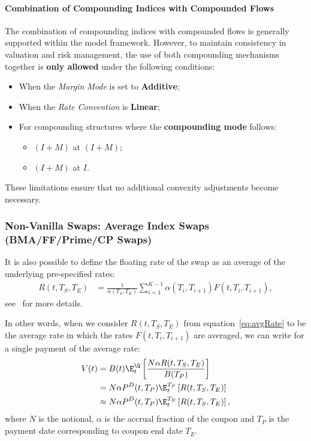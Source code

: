 \documentclass[]{pmv_report} %
\begin{document}
\paragraph{Combination of Compounding Indices with Compounded Flows}
The combination of compounding indices with compounded flows is generally supported within the model framework.
However, to maintain consistency in valuation and risk management, the use of both compounding mechanisms together is \textbf{only allowed} under the following conditions:
\begin{itemize}
    \item When the \textit{Margin Mode} is set to \textbf{Additive};
    \item When the \textit{Rate Convention} is \textbf{Linear};
    \item For compounding structures where the \textbf{compounding mode} follows:
    \begin{itemize}
        \item $(I+M)$ at $(I+M)$;
        \item $(I+M)$ at $I$.
    \end{itemize}
\end{itemize}
These limitations ensure that no additional convexity adjustments become necessary.

\subsubsection{Non-Vanilla Swaps: Average Index Swaps (BMA/FF/Prime/CP Swaps)} \label{sec:avgIdxSwap}
It is also possible to define the floating rate of the swap as an average of the underlying pre-specified rates:
\begin{align}
  R(t,T_S,T_E) &= \frac{1}{\alpha(T_S,T_E)} \sum_{i=1}^{K-1} \alpha(T_i,T_{i+1})F(t,T_i,T_{i+1}), \label{eq:avgRate}
\end{align}
see~\cite{Mx.StaticDataObjects} for more details.

In other words, when we consider $R(t,T_S,T_E)$ from equation~\eqref{eq:avgRate} to be the average rate in which the rates $F(t,T_i,T_{i+1})$ are averaged, we can write for a single payment of the average rate:
\begin{align}
  V(t) &= B(t) \E^{\Q}_t\left[ \frac{N \alpha R(t,T_S,T_E)}{B(T_P)}\right] \nonumber \\
  &= N \alpha P^D(t,T_P) \E^{T_P}_t\left[ R(t,T_S,T_E)\right]\nonumber \\
  &\approx N \alpha P^D(t,T_P) \E^{T_E}_t\left[ R(t,T_S,T_E)\right], \label{eq:avgSwap1}
\end{align}
where $N$ is the notional, $\alpha$ is the accrual fraction of the coupon and $T_P$ is the payment date corresponding to coupon end date $T_E$.
\end{document}

